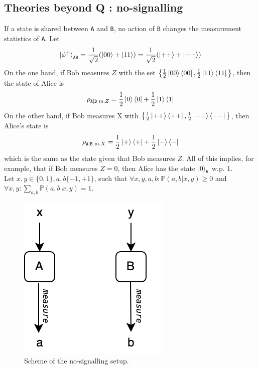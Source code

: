 \documentclass{article}
\begin{document}
\subsection{Theories beyond Q : no-signalling}
If a state is shared between \texttt{A} and \texttt{B}, no action of \texttt{B}
changes the measurement statistics of \texttt{A}. Let
\begin{equation}
    \ket{\phi^+}_{\texttt{AB}}
        = \frac{1}{\sqrt2}(\ket{00} + \ket{11})
        = \frac{1}{\sqrt2}(\ket{++} + \ket{--})
\end{equation}
On the one hand, if Bob measures $Z$
with the set $\big\{\frac{1}{2}\ket{00}\bra{00},\frac{1}{2}\ket{11}\bra{11}
\big\}$, then the state of Alice is
\begin{equation}
    \rho_{\texttt{A}|\texttt{B}\text{ m.}Z}
        = \frac{1}{2} \ket{0}\bra{0} + \frac{1}{2}\ket{1}\bra{1}
\end{equation}On the other hand, if
Bob measures X with
$\big\{\frac{1}{2}\ket{++}\bra{++},\frac{1}{2}\ket{--}\bra{--} \big\}$, then
Alice's state is
\begin{equation}
    \rho_{\texttt{A}|\texttt{B}\text{ m.}X}
        = \frac{1}{2}\ket{+}\bra{+} + \frac{1}{2}\ket{-}\bra{-}
\end{equation}
which is the same as the state given that Bob measures $Z$. All of this implies,
for example, that if Bob measures $Z = 0$, then Alice has the state
$\ket{0}_\texttt{A}$ w.p. 1.
\newline \\\noindent
Let $x, y\in \{0,1\}, a, b\{-1, +1\}$, such that $\forall x, y, a, b :
\mathbb{P}(a,b|x,y) \geq 0$ and $\forall x, y : \sum_{a,b}\mathbb{P}(a,b|x,y) =
1$.
\begin{figure}[h]
    \centering
    \includegraphics[scale=0.4]{no-signalling.png}
    \caption{Scheme of the no-signalling setup.}
\end{figure}
\end{document}
